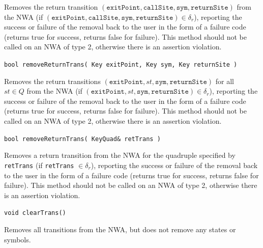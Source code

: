 \documentclass{llncs}
\begin{document}
\begin{description}
    Removes the return transition $(\texttt{exitPoint},\texttt{callSite},\texttt{sym},\texttt{returnSite})$ from the NWA (if $(\texttt{exitPoint},\texttt{callSite},\texttt{sym},\texttt{returnSite}) \in \delta_r$), reporting the success or failure of the removal back to the user in the form of a failure code (returns true for success, returns false for failure).  This method should not be called on an NWA of type 2, otherwise there is an assertion violation.

  \item\texttt{bool removeReturnTrans( Key exitPoint, Key sym, Key returnSite )}

    Removes the return transitions $(\texttt{exitPoint},st,\texttt{sym},\texttt{returnSite})$ for all \\$st \in Q$ from the NWA (if $(\texttt{exitPoint},st,\texttt{sym},\texttt{returnSite}) \in \delta_r$), reporting the success or failure of the removal back to the user in the form of a failure code (returns true for success, returns false for failure).  This method should not be called on an NWA of type 2, otherwise there is an assertion violation.

  \item\texttt{bool removeReturnTrans( KeyQuad\& retTrans )}

    Removes a return transition from the NWA for the quadruple specified by \texttt{retTrans} (if \texttt{retTrans} $\in \delta_r$), reporting the success or failure of the removal back to the user in the form of a failure code (returns true for success, returns false for failure).  This method should not be called on an NWA of type 2, otherwise there is an assertion violation.

  \item\texttt{void clearTrans()}

    Removes all transitions from the NWA, but does not remove any states or symbols. \\

\end{description}
\end{document}
